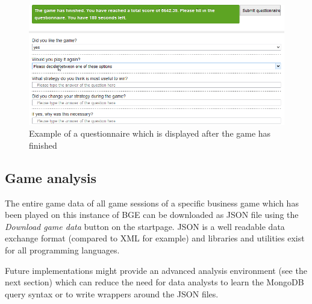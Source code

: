 \begin{figure}
	\centering
	\includegraphics[scale=0.61]{figures/questionnaire.png}
	\caption{Example of a questionnaire which is displayed after the game has finished}
	\label{fig:questionnaire}
\end{figure}

\subsection{Game analysis}
\label{sub:module:analysis}

The entire game data of all game sessions of a specific business game which has been played on this instance of BGE can be downloaded as JSON file using the \textit{Download game data} button on the startpage. JSON is a well readable data exchange format (compared to XML for example) and libraries and utilities exist for all programming languages. 

Future implementations might provide an advanced analysis environment (see the next section) which can reduce the need for data analysts to learn the MongoDB query syntax or to write wrappers around the JSON files.
\newpage
